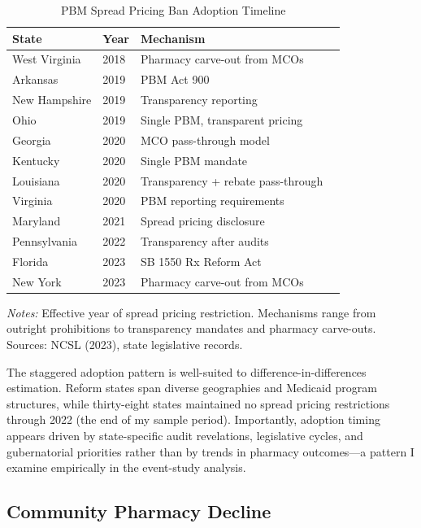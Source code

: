 \documentclass[12pt]{article}
\begin{document}
\begin{table}[htbp]
\centering
\caption{PBM Spread Pricing Ban Adoption Timeline}
\label{tab:timing}
\begin{threeparttable}
\begin{tabular}{llll}
\toprule
State & Year & Mechanism \\
\midrule
West Virginia & 2018 & Pharmacy carve-out from MCOs \\
Arkansas & 2019 & PBM Act 900 \\
New Hampshire & 2019 & Transparency reporting \\
Ohio & 2019 & Single PBM, transparent pricing \\
Georgia & 2020 & MCO pass-through model \\
Kentucky & 2020 & Single PBM mandate \\
Louisiana & 2020 & Transparency + rebate pass-through \\
Virginia & 2020 & PBM reporting requirements \\
Maryland & 2021 & Spread pricing disclosure \\
Pennsylvania & 2022 & Transparency after audits \\
Florida & 2023 & SB 1550 Rx Reform Act \\
New York & 2023 & Pharmacy carve-out from MCOs \\
\bottomrule
\end{tabular}
\begin{tablenotes}[flushleft]\small
\item \textit{Notes:} Effective year of spread pricing restriction. Mechanisms range from outright prohibitions to transparency mandates and pharmacy carve-outs. Sources: NCSL (2023), state legislative records.
\end{tablenotes}
\end{threeparttable}
\end{table}

The staggered adoption pattern is well-suited to difference-in-differences estimation. Reform states span diverse geographies and Medicaid program structures, while thirty-eight states maintained no spread pricing restrictions through 2022 (the end of my sample period). Importantly, adoption timing appears driven by state-specific audit revelations, legislative cycles, and gubernatorial priorities rather than by trends in pharmacy outcomes---a pattern I examine empirically in the event-study analysis.

\subsection{Community Pharmacy Decline}
\end{document}
